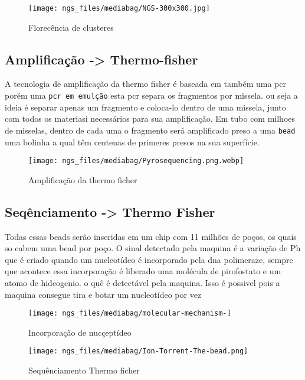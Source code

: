 \documentclass[
  letterpaper,
  DIV=11,
  numbers=noendperiod]{scrartcl}
\begin{document}
\begin{figure}[H]

{\centering \texttt{[image: ngs\_files/mediabag/NGS-300x300.jpg]}

}

\caption{Florecência de clusteres}

\end{figure}%

\subsection{Amplificação -\textgreater{}
Thermo-fisher}\label{amplificauxe7uxe3o---thermo-fisher}

A tecnologia de amplificação da thermo fisher é baseada em também uma
pcr porém uma \texttt{pcr\ em\ emulção} esta pcr separa os fragmentos
por missela. ou seja a ideia é separar apenas um fragmento e coloca-lo
dentro de uma missela, junto com todos os materiasi necessários para sua
amplificação. Em tubo com milhoes de misselas, dentro de cada uma o
fragmento será amplificado preso a uma \texttt{bead} uma bolinha a qual
têm centenas de primeres presos na sua superfície.

\begin{figure}[H]

{\centering \texttt{[image: ngs\_files/mediabag/Pyrosequencing.png.webp]}

}

\caption{Amplificação da thermo ficher}

\end{figure}%

\subsection{Seqênciamento -\textgreater{} Thermo
Fisher}\label{sequxeanciamento---thermo-fisher}

Todas essas beads serão inseridas em um chip com 11 milhões de poços, os
quais so cabem uma bead por poço. O sinal detectado pela maquina é a
variação de Ph que é criado quando um nucleotídeo é incorporado pela dna
polimeraze, sempre que acontece essa incorporação é liberado uma
molécula de pirofostato e um atomo de hideogenio. o quê é detectável
pela maquina. Isso é possivel pois a maquina consegue tira e botar um
nucleotídeo por vez

\begin{figure}[H]

{\centering \texttt{[image: ngs\_files/mediabag/molecular-mechanism-]}

}

\caption{Incorporação de nucçeptídeo}

\end{figure}%
\begin{figure}[H]

{\centering \texttt{[image: ngs\_files/mediabag/Ion-Torrent-The-bead.png]}

}

\caption{Sequênciamento Thermo ficher}

\end{figure}%
\end{document}
